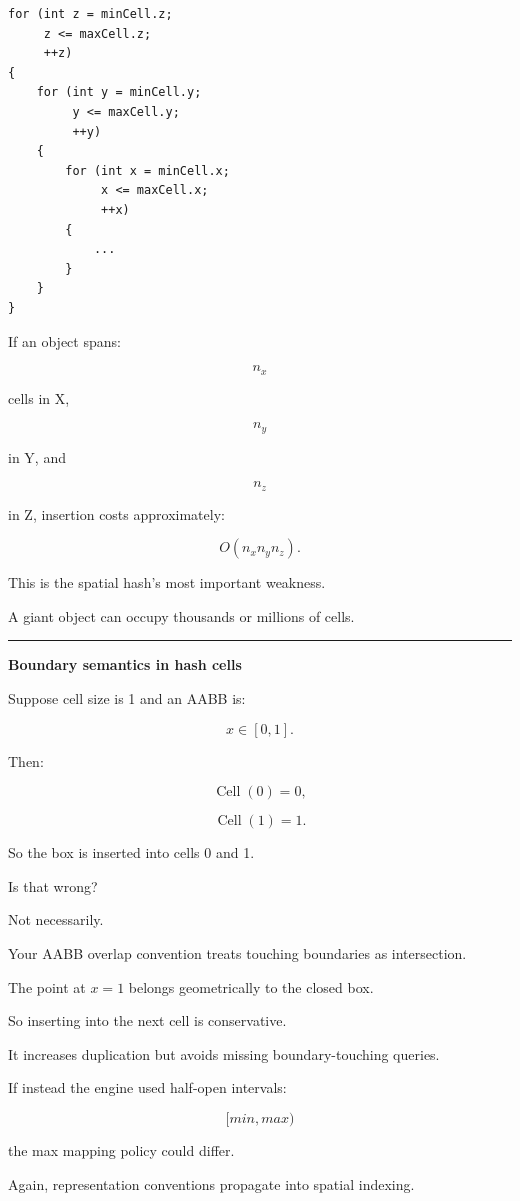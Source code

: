 \begin{verbatim}
for (int z = minCell.z;
     z <= maxCell.z;
     ++z)
{
    for (int y = minCell.y;
         y <= maxCell.y;
         ++y)
    {
        for (int x = minCell.x;
             x <= maxCell.x;
             ++x)
        {
            ...
        }
    }
}
\end{verbatim}

If an object spans:

\[
n_x
\]

cells in X,

\[
n_y
\]

in Y, and

\[
n_z
\]

in Z, insertion costs approximately:

\[
\boxed{
O(n_xn_yn_z).
}
\]

This is the spatial hash's most important weakness.

A giant object can occupy thousands or millions of cells.

\begin{center}\rule{0.5\linewidth}{0.5pt}\end{center}

\textbf{Boundary semantics in hash cells}

Suppose cell size is 1 and an AABB is:

\[
x\in[0,1].
\]

Then:

\[
\operatorname{Cell}(0)=0,
\]

\[
\operatorname{Cell}(1)=1.
\]

So the box is inserted into cells 0 and 1.

Is that wrong?

Not necessarily.

Your AABB overlap convention treats touching boundaries as intersection.

The point at \(x=1\) belongs geometrically to the closed box.

So inserting into the next cell is conservative.

It increases duplication but avoids missing boundary-touching queries.

If instead the engine used half-open intervals:

\[
[min,max)
\]

the max mapping policy could differ.

Again, representation conventions propagate into spatial indexing.

